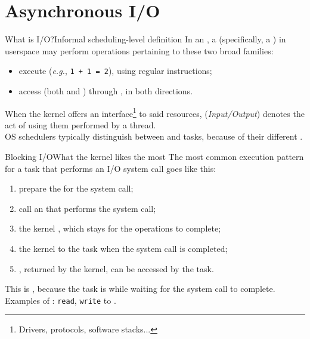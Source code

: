 
\section{Asynchronous I/O}
\graphicspath{{figs/section2/}}

\begin{frame}{What is I/O?}{Informal scheduling-level definition}
  \justifying
  In an , a  (specifically, a ) in userspace may perform operations pertaining to these two broad families:
  \begin{itemize}
    \item execute  (\emph{e.g.}, \texttt{1 + 1 = 2}), using regular  instructions;
    \item access  (both  and ) through ,  in both directions.
  \end{itemize}
  \bigskip
  When the kernel offers an interface\footnote{Drivers, protocols, software stacks...} to said resources,  (\emph{Input/Output}) denotes the act of using them performed by a thread.\\
  \bigskip
  OS schedulers typically distinguish between  and  tasks, because of their different .
\end{frame}

\begin{frame}{Blocking I/O}{What the kernel likes the most}
  \justifying
  The most common execution pattern for a task that performs an I/O system call goes like this:
  \begin{enumerate}
    \item prepare the  for the system call;
    \item call an  that performs the system call;
    \item the kernel , which stays  for the operations to complete;
    \item the kernel  to the task when the system call is completed;
    \item {}, returned by the kernel, can be accessed by the task.
  \end{enumerate}
  This is , because the task is  while waiting for the system call to complete.\\
  \bigskip
  Examples of : \texttt{read}, \texttt{write} to .
\end{frame}

